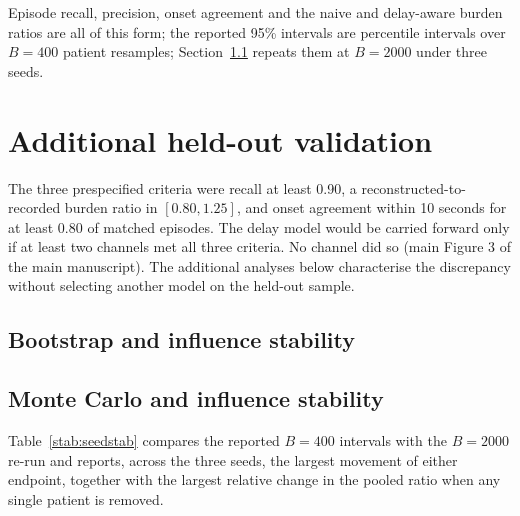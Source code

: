 \documentclass[11pt,letterpaper]{article}
\begin{document}
Episode recall, precision, onset agreement and the naive and delay-aware burden ratios are all of this form;
the reported 95\% intervals are percentile intervals over $B=400$ patient resamples; Section~\ref{s:bootstab} repeats
them at $B=2000$ under three seeds.



\section{Additional held-out validation}\label{s:validation}
The three prespecified criteria were recall at least 0.90, a reconstructed-to-recorded burden ratio in $[0.80,1.25]$, and onset agreement within 10 seconds for at least 0.80 of matched episodes. The delay model would be carried forward only if at least two channels met all three criteria. No channel did so (main Figure 3 of the main manuscript). The additional analyses below characterise the discrepancy without selecting another model on the held-out sample.
\subsection{Bootstrap and influence stability}\label{s:bootstab}

\subsection{Monte Carlo and influence stability}
Table~\ref{stab:seedstab} compares the reported $B=400$ intervals with the
$B=2000$ re-run and reports, across the three seeds, the largest movement of either endpoint, together with
the largest relative change in the pooled ratio when any single patient is removed.
\end{document}
